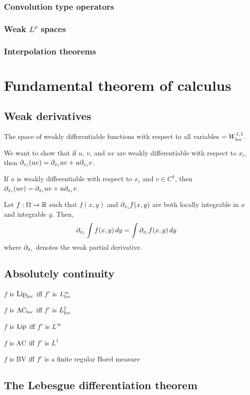 \documentclass{../note}
\begin{document}
\section{Convolution type operators}
\section{Weak $L^p$ spaces}
\section{Interpolation theorems}

\part{Fundamental theorem of calculus}

\chapter{Weak derivatives}

The space of weakly differentiable functions with respect to all variables $=W_{\mathrm{loc}}^{1,1}$.

\begin{prb}
We want to show that if $u$, $v$, and $uv$ are weakly differentiable with respect to $x_i$, then $\pd_{x_i}(uv)=\pd_{x_i}uv+u\pd_{x_i}v$.
\begin{parts}
\item If $u$ is weakly differentiable with respect to $x_i$ and $v\in C^1$, then $\pd_{x_i}(uv)=\pd_{x_i}uv+u\pd_{x_i}v$.
\end{parts}
\end{prb}


\begin{prb}
Let $f:\Omega\to\mathbb{R}$
such that $f(x,y)$ and $\pd_{x_i}f(x,y)$ are both locally integrable in $x$ and integrable $y$.
Then,
\[\pd_{x_i}\int f(x,y)\,dy=\int\pd_{x_i}f(x,y)\,dy\]
where $\pd_{x_i}$ denotes the weak partial derivative.
\end{prb}





\chapter{Absolutely continuity}

\begin{parts}
\item $f$ is $\operatorname{Lip}_{\mathrm{loc}}$ iff $f'$ is $L_{\mathrm{loc}}^\infty$
\item $f$ is $\textrm{AC}_{\mathrm{loc}}$ iff $f'$ is $L_{\mathrm{loc}}^1$
\end{parts}
\begin{parts}
\item $f$ is $\operatorname{Lip}$ iff $f'$ is $L^\infty$
\item $f$ is $\textrm{AC}$ iff $f'$ is $L^1$
\item $f$ is $\textrm{BV}$ iff $f'$ is a finite regular Borel measure
\end{parts}



\chapter{The Lebesgue differentiation theorem}
\end{document}
